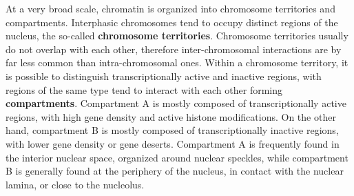 At a very broad scale, chromatin is organized into chromosome territories and compartments. Interphasic chromosomes tend to occupy distinct regions of the nucleus, the so-called \textbf{chromosome territories}\cite{chromosometerritories2010}. Chromosome territories usually do not overlap with each other, therefore inter-chromosomal interactions are by far less common than intra-chromosomal ones. Within a chromosome territory, it is possible to distinguish transcriptionally active and inactive regions, with regions of the same type tend to interact with each other forming \textbf{compartments}. %
Compartment A is mostly composed of transcriptionally active regions, with high gene density and active histone modifications. On the other hand, compartment B is mostly composed of transcriptionally inactive regions, with lower gene density or gene deserts\cite{chromatindevelopment2019}. Compartment A is frequently found in the interior nuclear space, organized around nuclear speckles, while compartment B is generally found at the periphery of the nucleus, in contact with the nuclear lamina, or close to the nucleolus\cite{chromatinorganization2019, chromatindevelopment2019}.

